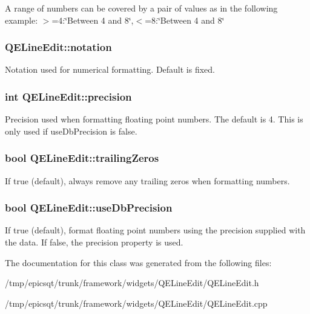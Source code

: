 A range of numbers can be covered by a pair of values as in the following example: $>$=4:\char`\"{}Between 4 and 8\char`\"{},$<$=8:\char`\"{}Between 4 and 8\char`\"{} \hypertarget{classQELineEdit_a496e07607a7a0b46c8d176fb627526fb}{
\subsubsection[{notation}]{ QELineEdit::notation}}
\label{classQELineEdit_a496e07607a7a0b46c8d176fb627526fb}
Notation used for numerical formatting. Default is fixed. \hypertarget{classQELineEdit_aab833120f7bc6e47e69da4c8ffb5c434}{
\subsubsection[{precision}]{\setlength{\rightskip}{0pt plus 5cm}int QELineEdit::precision}}
\label{classQELineEdit_aab833120f7bc6e47e69da4c8ffb5c434}
Precision used when formatting floating point numbers. The default is 4. This is only used if useDbPrecision is false. \hypertarget{classQELineEdit_ac6073240cb58c420719d272e47dff6c6}{
\subsubsection[{trailingZeros}]{\setlength{\rightskip}{0pt plus 5cm}bool QELineEdit::trailingZeros}}
\label{classQELineEdit_ac6073240cb58c420719d272e47dff6c6}
If true (default), always remove any trailing zeros when formatting numbers. \hypertarget{classQELineEdit_a208d85ec1cbb9f1326e1fc33e1af1a7c}{
\subsubsection[{useDbPrecision}]{\setlength{\rightskip}{0pt plus 5cm}bool QELineEdit::useDbPrecision}}
\label{classQELineEdit_a208d85ec1cbb9f1326e1fc33e1af1a7c}
If true (default), format floating point numbers using the precision supplied with the data. If false, the precision property is used. 

The documentation for this class was generated from the following files:\begin{DoxyCompactItemize}
\item 
/tmp/epicsqt/trunk/framework/widgets/QELineEdit/QELineEdit.h\item 
/tmp/epicsqt/trunk/framework/widgets/QELineEdit/QELineEdit.cpp\end{DoxyCompactItemize}
